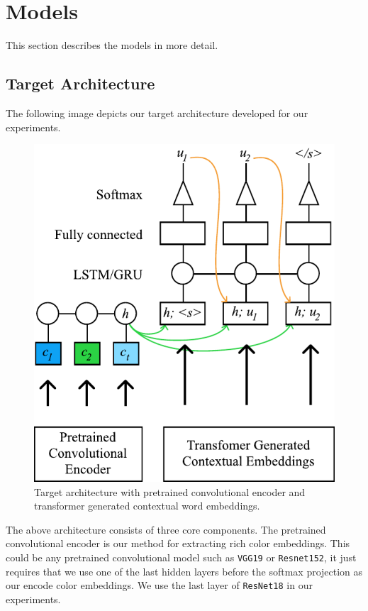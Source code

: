 \section{Models}

This section describes the models in more detail.

\subsection{Target Architecture}
The following image depicts our target architecture developed for our experiments.

\begin{figure}[ht]
\centering
\includegraphics[width=\columnwidth]{assets/target_architecture.pdf}
\caption[Target Architecture]
{Target architecture with pretrained convolutional encoder and transformer generated contextual word embeddings.}
\label{overview}
\end{figure}

\par
The above architecture consists of three core components. The pretrained convolutional encoder is our method for extracting rich color embeddings. This could be any pretrained convolutional model such as \texttt{VGG19} or \texttt{Resnet152}, it just requires that we use one of the last hidden layers before the softmax projection as our encode color embeddings. We use the last layer of \texttt{ResNet18} in our experiments.

